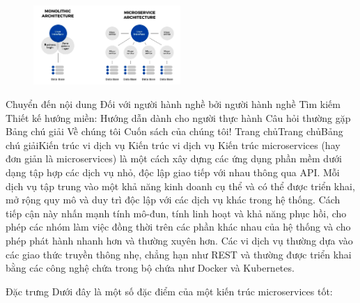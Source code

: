 \begin{figure}[h]
\centering
\includegraphics[height = 3cm]{pictures/AnhKhacNhau_KienTrucNguyenKhoi_KienTrucViDichVu.png}
\end{figure}
Chuyển đến nội dung
Đối với người hành nghề bởi người hành nghề
Tìm kiếm
Thiết kế hướng miền: Hướng dẫn dành cho người thực hành
Câu hỏi thường gặp
Bảng chú giải
Về chúng tôi
Cuốn sách của chúng tôi!
Trang chủTrang chủBảng chú giảiKiến trúc vi dịch vụ
Kiến trúc vi dịch vụ
Kiến trúc microservices (hay đơn giản là microservices) là một cách xây dựng các ứng dụng phần mềm dưới dạng tập hợp các dịch vụ nhỏ, độc lập giao tiếp với nhau thông qua API. Mỗi dịch vụ tập trung vào một khả năng kinh doanh cụ thể và có thể được triển khai, mở rộng quy mô và duy trì độc lập với các dịch vụ khác trong hệ thống. Cách tiếp cận này nhấn mạnh tính mô-đun, tính linh hoạt và khả năng phục hồi, cho phép các nhóm làm việc đồng thời trên các phần khác nhau của hệ thống và cho phép phát hành nhanh hơn và thường xuyên hơn. Các vi dịch vụ thường dựa vào các giao thức truyền thông nhẹ, chẳng hạn như REST và thường được triển khai bằng các công nghệ chứa trong bộ chứa như Docker và Kubernetes.

Đặc trưng
Dưới đây là một số đặc điểm của một kiến ​​trúc microservices tốt:

